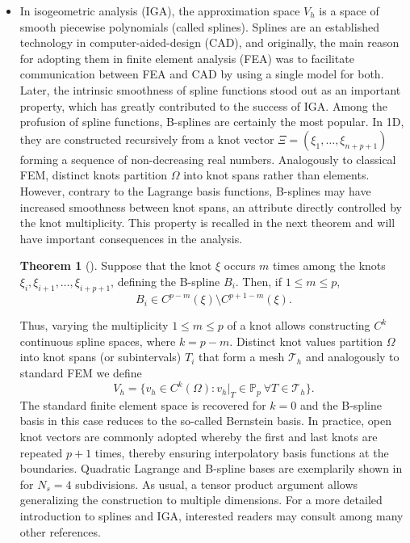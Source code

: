 \documentclass{article}
\numberwithin{equation}{section}
\theoremstyle{definition}
\newtheorem{theorem}[definition]{Theorem}
\begin{document}
\begin{itemize}
    \item In isogeometric analysis (IGA), the approximation space $V_h$ is a space of smooth piecewise polynomials (called splines). Splines are an established technology in computer-aided-design (CAD), and originally, the main reason for adopting them in finite element analysis (FEA) was to facilitate communication between FEA and CAD by using a single model for both. Later, the intrinsic smoothness of spline functions stood out as an important property, which has greatly contributed to the success of IGA. Among the profusion of spline functions, B-splines are certainly the most popular. In 1D, they are constructed recursively from a knot vector $\Xi = (\xi_1,\dots,\xi_{n+p+1})$ forming a sequence of non-decreasing real numbers. Analogously to classical FEM, distinct knots partition $\Omega$ into knot spans rather than elements. However, contrary to the Lagrange basis functions, B-splines may have increased smoothness between knot spans, an attribute directly controlled by the knot multiplicity. This property is recalled in the next theorem and will have important consequences in the analysis.

    \begin{theorem}[{\cite[Theorem 3.19]{lyche2018spline}}]
    \label{thm: spline_continuity}
    Suppose that the knot $\xi$ occurs $m$ times among the knots $\xi_i, \xi_{i+1}, \dots, \xi_{i+p+1}$, defining the B-spline $B_i$. Then, if $1 \leq m \leq p$,
    \begin{equation*}
        B_i \in C^{p-m}(\xi) \setminus C^{p+1-m}(\xi).
    \end{equation*}
    \end{theorem}
    Thus, varying the multiplicity $1 \leq m \leq p$ of a knot allows constructing $C^k$ continuous spline spaces, where $k=p-m$. Distinct knot values partition $\Omega$ into knot spans (or subintervals) $T_i$ that form a mesh $\mathcal{T}_h$ and analogously to standard FEM we define
    \begin{equation*}
        V_h = \{v_h \in C^k(\Omega)\colon v_h|_{T} \in \mathbb{P}_p \ \forall T \in \mathcal{T}_h\}.
    \end{equation*}
    The standard finite element space is recovered for $k=0$ and the B-spline basis in this case reduces to the so-called Bernstein basis. In practice, open knot vectors are commonly adopted whereby the first and last knots are repeated $p+1$ times, thereby ensuring interpolatory basis functions at the boundaries. Quadratic Lagrange and B-spline bases are exemplarily shown in  for $N_s=4$ subdivisions. As usual, a tensor product argument allows generalizing the construction to multiple dimensions. For a more detailed introduction to splines and IGA, interested readers may consult \cite{lyche2018spline,kunoth2018splines,cottrell2009isogeometric} among many other references.
\end{itemize}
\end{document}
